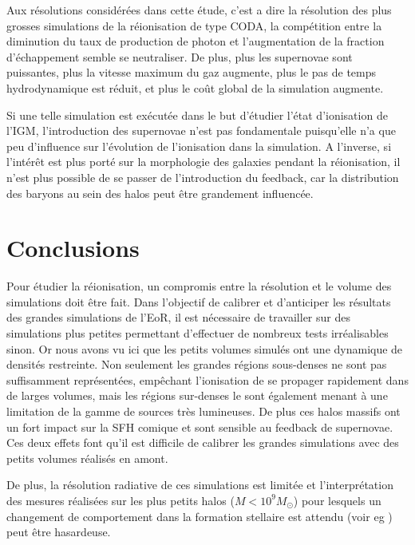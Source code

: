 Aux résolutions considérées dans cette étude, c'est a dire la résolution des plus grosses simulations de la réionisation de type CODA,  %
la compétition entre la diminution du taux de production de photon et l'augmentation de la fraction d'échappement semble se neutraliser.
De plus, plus les supernovae sont puissantes, plus la vitesse maximum du gaz augmente, plus le pas de temps hydrodynamique est réduit, et plus le coût global de la simulation augmente.

Si une telle simulation est exécutée dans le but d'étudier l'état d'ionisation de l'\ac{IGM}, l'introduction des supernovae n'est pas fondamentale puisqu'elle n'a que peu d'influence sur l'évolution de l'ionisation dans la simulation.
A l'inverse, si l’intérêt est plus porté sur la morphologie des galaxies pendant la réionisation, il n'est plus possible de se passer de l'introduction du feedback, car la distribution des baryons au sein des halos peut être grandement influencée.



\section{Conclusions}

Pour étudier la réionisation, un compromis entre la résolution et le volume des simulations doit être fait.
Dans l'objectif de calibrer et d'anticiper les résultats des grandes simulations de l'\ac{EoR}, il est nécessaire de travailler sur des simulations plus petites permettant d'effectuer de nombreux tests irréalisables sinon. 
Or nous avons vu ici que les petits volumes simulés ont une dynamique de densités restreinte. 
Non seulement les grandes régions sous-denses ne sont pas suffisamment représentées, empêchant l'ionisation de se propager rapidement dans de larges volumes, mais les régions sur-denses le sont également menant à une limitation de la gamme de sources très lumineuses.
De plus ces halos massifs ont un fort impact sur la \ac{SFH} comique et sont sensible au feedback de supernovae.
Ces deux effets font qu'il est difficile de calibrer les grandes simulations avec des petits volumes réalisés en amont.

De plus, la résolution radiative de ces simulations est limitée et l'interprétation des mesures réalisées sur les plus petits halos ($M < 10^9M_\odot$) pour lesquels un changement de comportement dans la formation stellaire est attendu (voir eg \cite{2001PhR...349..125B}) peut être hasardeuse.

